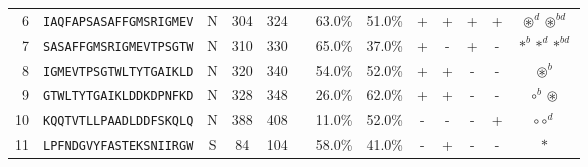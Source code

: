 \begin{tabular}{rcccccccccccc}
6  &  \texttt{IAQFAPSASAFFGMSRIGMEV} &       N &    304 &   324 &                                                                  &                          63.0\% &                           51.0\% &          + &           + &          + &           + &                                                                                                                          $ \circledast^d \circledast^{bd} $ \\
7  &  \texttt{SASAFFGMSRIGMEVTPSGTW} &       N &    310 &   330 &                                                                  &                          65.0\% &                           37.0\% &          + &           - &          + &           - &                                                                                                                                 $ \ast^b \ast^d \ast^{bd} $ \\
8  &  \texttt{IGMEVTPSGTWLTYTGAIKLD} &       N &    320 &   340 &                                                                  &                          54.0\% &                           52.0\% &          + &           + &          - &           - &                                                                                                                                           $ \circledast^b $ \\
9  &  \texttt{GTWLTYTGAIKLDDKDPNFKD} &       N &    328 &   348 &                                                                  &                          26.0\% &                           62.0\% &          + &           + &          - &           - &                                                                                                                                     $ \circ^b \circledast $ \\
10 &  \texttt{KQQTVTLLPAADLDDFSKQLQ} &       N &    388 &   408 &                                                                  &                          11.0\% &                           52.0\% &          - &           - &          - &           + &                                                                                                                                           $ \circ \circ^d $ \\
11 &  \texttt{LPFNDGVYFASTEKSNIIRGW} &       S &     84 &   104 &                                                                  &                          58.0\% &                           41.0\% &          - &           + &          - &           - &                                                                                                                                                    $ \ast $ \\

\end{tabular}
